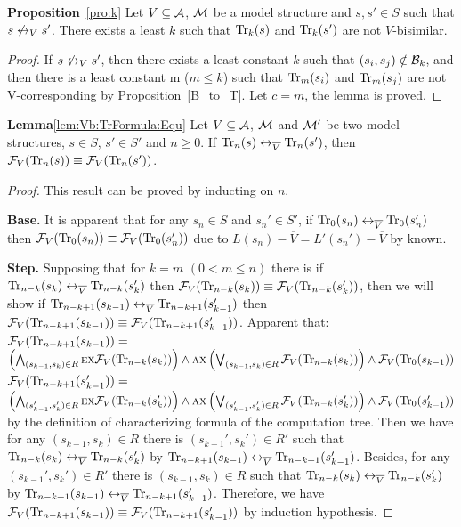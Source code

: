 \documentclass[letterpaper]{article} %
\begin{document}
\noindent\textbf{Proposition}~\ref{pro:k}   Let $V\subseteq {\cal A}$, ${\cal M}$ be a model structure and $s,s'\in S$
  such that $s\not\leftrightarrow_V s'$.
  There exists a least  $k$ such that
  $\textrm{Tr}_k(s)$ and $\textrm{Tr}_k(s')$ are not $V$-bisimilar.\\
\begin{proof}
If $s\not\leftrightarrow_V s'$, then there exists a least constant $k$ such that $(s_i, s_j) \notin {\cal B}_k$, and then there is a least constant m ($m \leq k$) such that $\textrm{Tr}_m(s_i)$ and $\textrm{Tr}_m(s_j)$ are not V-corresponding by Proposition~\ref{B_to_T}. Let $c=m$, the lemma is proved.
\end{proof}









\textbf{Lemma}\ref{lem:Vb:TrFormula:Equ} Let $V\subseteq {\cal A}$, ${\cal M}$ and ${\cal M}'$ be two model structures,
$s\in S$, $s'\in S'$ and $n\ge 0$. If $\textrm{Tr}_n(s) \leftrightarrow_{\overline V} \textrm{Tr}_n(s')$, then ${\cal F}_V(\textrm{Tr}_n(s)) \equiv {\cal F}_V(\textrm{Tr}_n(s'))$.\\
\begin{proof}
This result can be proved by inducting on $n$.

\textbf{Base.} It is apparent that for any $s_n\in S$ and $s_n' \in S'$, if $\textrm{Tr}_0(s_n) \leftrightarrow_{\overline V} \textrm{Tr}_0(s_n')$ then ${\cal F}_V(\textrm{Tr}_0(s_n)) \equiv {\cal F}_V(\textrm{Tr}_0(s_n'))$ due to $L(s_n) - \overline V = L'(s_n') - \overline V$ by known.

\textbf{Step.} Supposing that for $k=m$ $(0< m \leq n)$ there is if $\textrm{Tr}_{n-k}(s_k) \leftrightarrow_{\overline V} \textrm{Tr}_{n-k}(s_k')$ then ${\cal F}_V(\textrm{Tr}_{n-k}(s_k)) \equiv {\cal F}_V(\textrm{Tr}_{n-k}(s_k'))$, then we will show if $\textrm{Tr}_{n-k+1}(s_{k-1}) \leftrightarrow_{\overline V} \textrm{Tr}_{n-k+1}(s_{k-1}')$ then ${\cal F}_V(\textrm{Tr}_{n-k+1}(s_{k-1})) \equiv {\cal F}_V(\textrm{Tr}_{n-k+1}(s_{k-1}'))$. Apparent that:\\
 ${\cal F}_V(\textrm{Tr}_{n-k+1}(s_{k-1})) =$
 $\left(\bigwedge_{(s_{k-1},s_k)\in R}
    \textsc{e} \textsc{x} {\cal F}_V(\textrm{Tr}_{n-k}(s_k))\right)
    \wedge \textsc{a} \textsc{x}\left(\bigvee_{(s_{k-1},s_k)\in R}
    {\cal F}_V(\textrm{Tr}_{n-k}(s_k) )\right)
    \wedge {\cal F}_V(\textrm{Tr}_0(s_{k-1}))$\\
 ${\cal F}_V(\textrm{Tr}_{n-k+1}(s_{k-1}')) =$
 $\left(\bigwedge_{(s_{k-1}',s_k')\in R}
    \textsc{e} \textsc{x} {\cal F}_V(\textrm{Tr}_{n-k}(s_k'))\right)
    \wedge \textsc{a} \textsc{x}\left(\bigvee_{(s_{k-1}',s_k')\in R}
    {\cal F}_V(\textrm{Tr}_{n-k}(s_k') )\right)
    \wedge {\cal F}_V(\textrm{Tr}_0(s_{k-1}'))$ by the definition of characterizing formula of the computation tree.
 Then we have for any $(s_{k-1}, s_k) \in R$ there is $(s_{k-1}', s_k') \in R'$ such that $\textrm{Tr}_{n-k}(s_k) \leftrightarrow_{\overline V} \textrm{Tr}_{n-k}(s_k')$ by $\textrm{Tr}_{n-k+1}(s_{k-1}) \leftrightarrow_{\overline V} \textrm{Tr}_{n-k+1}(s_{k-1}')$. Besides, for any $(s_{k-1}', s_k') \in R'$ there is $(s_{k-1}, s_k) \in R$ such that $\textrm{Tr}_{n-k}(s_k) \leftrightarrow_{\overline V} \textrm{Tr}_{n-k}(s_k')$ by $\textrm{Tr}_{n-k+1}(s_{k-1}) \leftrightarrow_{\overline V} \textrm{Tr}_{n-k+1}(s_{k-1}')$.
 Therefore, we have ${\cal F}_V(\textrm{Tr}_{n-k+1}(s_{k-1})) \equiv {\cal F}_V(\textrm{Tr}_{n-k+1}(s_{k-1}'))$ by induction hypothesis.
\end{proof}
\end{document}
